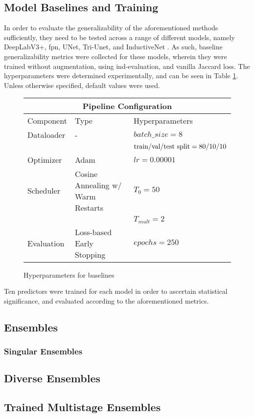     \subsection{Model Baselines and Training}
        In order to evaluate the generalizability of the aforementioned methods sufficiently, they need to be tested across a range of different models, namely DeepLabV3+, \gls{fpn}, UNet, Tri-Unet, and InductiveNet . As such, baseline generalizability metrics were collected for these models, wherein they were trained without augmentation, using \gls{ind}-evaluation, and vanilla Jaccard loss. The hyperparameters were determined experimentally, and can be seen in Table \ref{table:hyperparameters}. Unless otherwise specified, default values were used. 
        \begin{figure}[h]
            \centering
        \begin{tabularx}{\linewidth}{XXX}
        \toprule
        \multicolumn{3}{c}{\textbf{Pipeline Configuration}}\\
        \toprule
        Component & Type & Hyperparameters \\
        \midrule
        Dataloader & - & \(batch\_size = 8\) \\
        && \(\hbox{train/val/test split} = 80/10/10\)\\
        \midrule
        Optimizer & Adam & \(lr = 0.00001\)\\
        \midrule
        Scheduler & Cosine Annealing w/ Warm Restarts & \(T_0=50\) \\
        & & \(T_{mult}=2\) \\
        \midrule
        Evaluation & Loss-based Early Stopping & \(epochs=250\)\\
        \bottomrule
        \end{tabularx}
            \caption{Hyperparameters for baselines}
            \label{table:hyperparameters}
        \end{figure}
        Ten predictors were trained for each model in order to ascertain statistical significance, and evaluated according to the aforementioned metrics. 
        
    
    

        
     \subsection{Ensembles}
        \subsubsection{Singular Ensembles}
        \subsection{Diverse Ensembles}
        \subsection{Trained Multistage Ensembles}
        